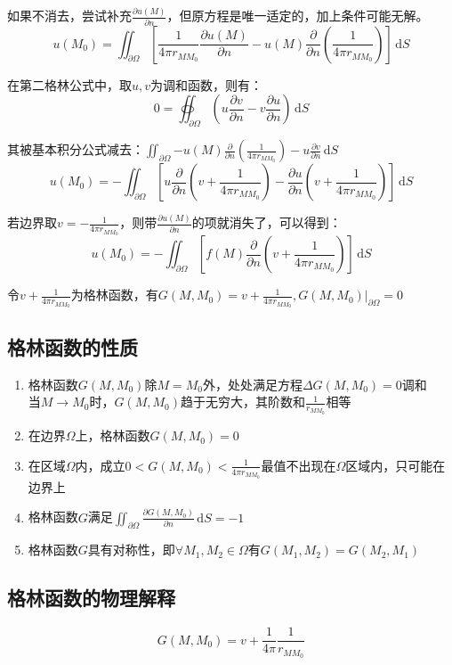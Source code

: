 如果不消去，尝试补充\(\frac{\partial u\left(M\right)}{\partial n}\)，但原方程是唯一适定的，加上条件可能无解。
\[
u(M_0)=\iint_{\partial\Omega}\left[\frac{1}{4\pi r_{MM_0}}\frac{\partial u\left(M\right)}{\partial n}-u\left(M\right)\frac{\partial}{\partial n}\left(\frac{1}{{4\pi r}_{MM_0}}\right)\right]\,\mathrm{d}S
\]

在第二格林公式中，取\(u,v\)为调和函数，则有：
\[
0=\oiint_{\partial\Omega}\left(u\frac{\partial v}{\partial n}-v\frac{\partial u}{\partial n}\right)\,\mathrm{d}S
\]

其被基本积分公式减去：\(\iint_{\partial\Omega}{-u\left(M\right)\frac{\partial}{\partial n}\left(\frac{1}{{4\pi r}_{MM_0}}\right)-u\frac{\partial v}{\partial n}\,\mathrm{d}S}\)
\[
u(M_0)=-\iint_{\partial\Omega}\left[ u\frac{\partial}{\partial n}\left(v+\frac{1}{4\pi r_{MM_0}}\right)-\frac{\partial u}{\partial n}\left(v+\frac{1}{{4\pi r}_{MM_0}}\right)\right]\,\mathrm{d}S 
\]

若边界取\(v=-\frac{1}{4\pi r_{MM_0}}\)，则带\(\frac{\partial u\left(M\right)}{\partial n}\)的项就消失了，可以得到：
\[
u(M_0)=-\iint_{\partial\Omega}\left[f(M)\frac{\partial}{\partial n}\left(v+\frac{1}{4\pi r_{MM_0}}\right)\right]\,\mathrm{d}S
\]

令\(v+\frac{1}{4\pi r_{MM_0}}\)为格林函数，有\(G(M,M_0)=v+\frac{1}{4\pi  r_{MM_0}},G(M,M_0)|_{\partial\Omega}=0\)

\subsection{格林函数的性质}
\begin{enumerate}
	\item 格林函数\(G(M,M_0)\)除\(M=M_0\)外，处处满足方程\(\Delta G(M,M_0)=0\)调和\\
	当\(M\to M_0\)时，\(G(M,M_0)\)趋于无穷大，其阶数和\(\frac{1}{r_{MM_0}}\)相等
	\item 在边界\(\Omega\)上，格林函数\(G(M,M_0)=0\)
	\item 在区域\(\Omega\)内，成立\(0<G(M,M_0)<\frac{1}{4\pi  r_{MM_0}}\)最值不出现在\(\Omega\)区域内，只可能在边界上
	\item 格林函数\(G\)满足\(\iint_{\partial\Omega}\frac{\partial G(M,M_0)}{\partial n}\,\mathrm{d}S=-1\)
	\item 格林函数\(G\)具有对称性，即\(\forall M_1,M_2\in\Omega\)有\(G(M_1,M_2)=G(M_2,M_1)\)
\end{enumerate}

\subsection{格林函数的物理解释}
\[
G(M,M_0)=v+\frac{1}{4\pi}\frac{1}{r_{MM_0}}
\]

